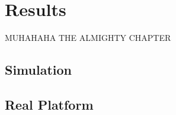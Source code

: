 \section{Results}
\label{results}

MUHAHAHA THE ALMIGHTY CHAPTER

\subsection{Simulation}
\label{sim}

\subsection{Real Platform}
\label{real}
